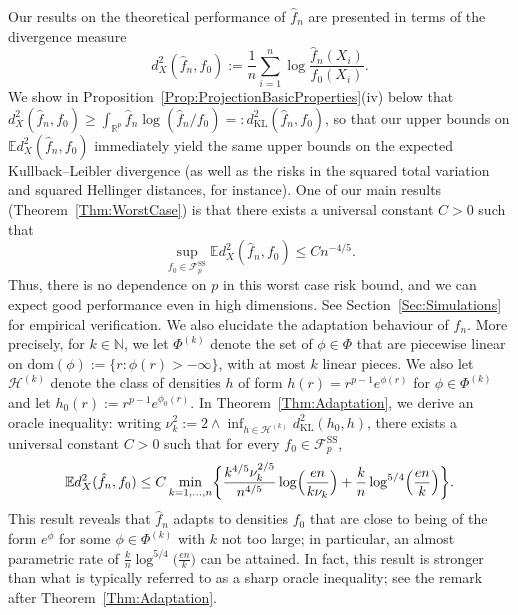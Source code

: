 \documentclass[a4paper,12pt]{article}
\begin{document}
Our results on the theoretical performance of $\hat{f}_n$ are presented in terms of the divergence measure
\[
d_X^2(\hat{f}_n,f_0) := \frac{1}{n}\sum_{i=1}^n \log \frac{\hat{f}_n(X_i)}{f_0(X_i)}.
\]
We show in Proposition~\ref{Prop:ProjectionBasicProperties}(iv) below that $d_X^2(\hat{f}_n,f_0) \geq \int_{\mathbb{R}^p} \hat{f}_n \log (\hat{f}_n/f_0) =: d_{\mathrm{KL}}^2(\hat{f}_n,f_0)$, so that our upper bounds on $\mathbb{E} d_X^2(\hat{f}_n,f_0)$ immediately yield the same upper bounds on the expected Kullback--Leibler divergence (as well as the risks in the squared total variation and squared Hellinger distances, for instance).  One of our main results (Theorem~\ref{Thm:WorstCase}) is that there exists a universal constant $C > 0$ such that
\[
\sup_{f_0 \in \mathcal{F}_p^{\mathrm{SS}}} \mathbb{E}d_X^2(\hat{f}_n,f_0) \leq Cn^{-4/5}.
\]
Thus, there is no dependence on $p$ in this worst case risk bound, and we can expect good performance even in high dimensions.  See Section~\ref{Sec:Simulations} for empirical verification.  We also elucidate the adaptation behaviour of $\hat{f}_n$.  More precisely, for $k \in \mathbb{N}$, we let $\Phi^{(k)}$ denote the set of $\phi \in \Phi$ that are piecewise linear on $\mathrm{dom}(\phi) := \{r:\phi(r) > -\infty\}$, with at most $k$ linear pieces. We also let $\mathcal{H}^{(k)}$ denote the class of densities $h$ of form $h(r) = r^{p-1} e^{\phi(r)}$ for $\phi \in \Phi^{(k)}$ and let $h_0(r) := r^{p-1} e^{\phi_0(r)}$. In Theorem~\ref{Thm:Adaptation}, we derive an oracle inequality: writing $\nu_k^2 := 2 \wedge \inf_{h \in \mathcal{H}^{(k)}} d_{\mathrm{KL}}^2(h_0, h)$, there exists a universal constant $C > 0$ such that for every $f_0 \in \mathcal{F}_p^{\mathrm{SS}}$, 
\[
\mathbb{E}d_X^2(\hat{f}_n,f_0) \leq C \min_{k =1,\ldots,n} \biggl\{\frac{k^{4/5}\nu_k^{2/5}}{n^{4/5}}\log\Bigl(\frac{en}{k\nu_k}\Bigr) + \frac{k}{n}\log^{5/4}\Bigl(\frac{en}{k}\Bigr)\biggr\}.
\]
This result reveals that $\hat{f}_n$ adapts to densities $f_0$ that are close to being of the form $e^\phi$ for some $\phi \in \Phi^{(k)}$ with $k$ not too large; in particular, an almost parametric rate of $\frac{k}{n}\log^{5/4}\bigl(\frac{en}{k}\bigr)$ can be attained.  In fact, this result is stronger than what is typically referred to as a sharp oracle inequality; see the remark after Theorem~\ref{Thm:Adaptation}.
\end{document}

